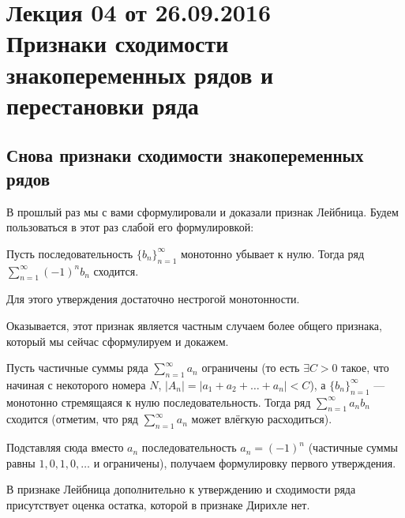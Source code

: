 \documentclass[a4paper, 12pt]{article}
\begin{document}
\pagestyle{fancy}
\section{Лекция 04 от 26.09.2016 \\ Признаки сходимости знакопеременных рядов и перестановки ряда}
\subsection{Снова признаки сходимости знакопеременных рядов}

В прошлый раз мы с вами сформулировали и доказали признак Лейбница. Будем пользоваться в этот раз слабой его формулировкой:
\begin{Test}
	Пусть последовательность $\{b_n\}_{n = 1}^{\infty}$ монотонно убывает к нулю. Тогда ряд $\sum\limits_{n = 1}^{\infty}(-1)^n b_n$ сходится. 
\end{Test}
\begin{Comment}
	Для этого утверждения достаточно нестрогой монотонности.
\end{Comment}
Оказывается, этот признак является частным случаем более общего признака, который мы сейчас сформулируем и докажем.
\begin{Test}
	Пусть частичные суммы ряда $\sum\limits_{n=1}^{\infty}a_n$ ограничены (то есть $\exists C>0$ такое, что начиная с некоторого номера $N$, $|A_n| = |a_1 + a_2 + \ldots + a_n| < C$), а $\{b_n\}_{n=1}^{\infty}$ --- монотонно стремящаяся к нулю  последовательность. Тогда ряд $\sum\limits_{n=1}^{\infty}a_nb_n$ сходится (отметим, что ряд $\sum\limits_{n=1}^{\infty}a_n$ может влёгкую расходиться). 
\end{Test}
Подставляя сюда вместо $a_n$ последовательность $a_n = (-1)^n$ (частичные суммы равны $1, 0, 1, 0, \ldots$ и ограничены), получаем формулировку первого утверждения.
\begin{Comment}
	В признаке Лейбница дополнительно к утверждению и сходимости ряда присутствует оценка остатка, которой в признаке Дирихле нет.
\end{Comment}
\end{document}
